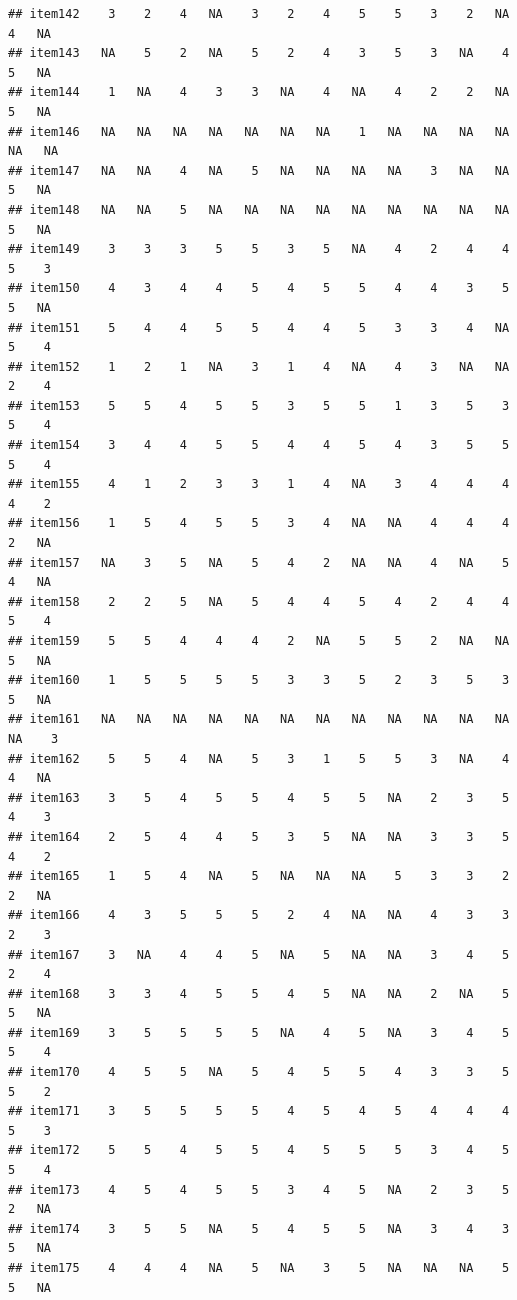 \documentclass[
  man]{apa6}
\begin{document}
\begin{verbatim}
## item142    3    2    4   NA    3    2    4    5    5    3    2   NA    4   NA
## item143   NA    5    2   NA    5    2    4    3    5    3   NA    4    5   NA
## item144    1   NA    4    3    3   NA    4   NA    4    2    2   NA    5   NA
## item146   NA   NA   NA   NA   NA   NA   NA    1   NA   NA   NA   NA   NA   NA
## item147   NA   NA    4   NA    5   NA   NA   NA   NA    3   NA   NA    5   NA
## item148   NA   NA    5   NA   NA   NA   NA   NA   NA   NA   NA   NA    5   NA
## item149    3    3    3    5    5    3    5   NA    4    2    4    4    5    3
## item150    4    3    4    4    5    4    5    5    4    4    3    5    5   NA
## item151    5    4    4    5    5    4    4    5    3    3    4   NA    5    4
## item152    1    2    1   NA    3    1    4   NA    4    3   NA   NA    2    4
## item153    5    5    4    5    5    3    5    5    1    3    5    3    5    4
## item154    3    4    4    5    5    4    4    5    4    3    5    5    5    4
## item155    4    1    2    3    3    1    4   NA    3    4    4    4    4    2
## item156    1    5    4    5    5    3    4   NA   NA    4    4    4    2   NA
## item157   NA    3    5   NA    5    4    2   NA   NA    4   NA    5    4   NA
## item158    2    2    5   NA    5    4    4    5    4    2    4    4    5    4
## item159    5    5    4    4    4    2   NA    5    5    2   NA   NA    5   NA
## item160    1    5    5    5    5    3    3    5    2    3    5    3    5   NA
## item161   NA   NA   NA   NA   NA   NA   NA   NA   NA   NA   NA   NA   NA    3
## item162    5    5    4   NA    5    3    1    5    5    3   NA    4    4   NA
## item163    3    5    4    5    5    4    5    5   NA    2    3    5    4    3
## item164    2    5    4    4    5    3    5   NA   NA    3    3    5    4    2
## item165    1    5    4   NA    5   NA   NA   NA    5    3    3    2    2   NA
## item166    4    3    5    5    5    2    4   NA   NA    4    3    3    2    3
## item167    3   NA    4    4    5   NA    5   NA   NA    3    4    5    2    4
## item168    3    3    4    5    5    4    5   NA   NA    2   NA    5    5   NA
## item169    3    5    5    5    5   NA    4    5   NA    3    4    5    5    4
## item170    4    5    5   NA    5    4    5    5    4    3    3    5    5    2
## item171    3    5    5    5    5    4    5    4    5    4    4    4    5    3
## item172    5    5    4    5    5    4    5    5    5    3    4    5    5    4
## item173    4    5    4    5    5    3    4    5   NA    2    3    5    2   NA
## item174    3    5    5   NA    5    4    5    5   NA    3    4    3    5   NA
## item175    4    4    4   NA    5   NA    3    5   NA   NA   NA    5    5   NA

\end{verbatim}
\end{document}
